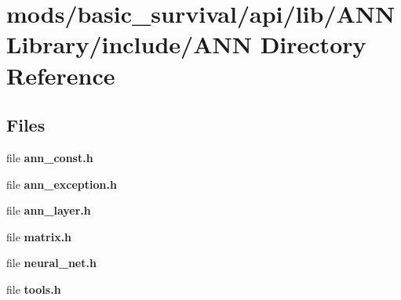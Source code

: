 \section{mods/basic\+\_\+survival/api/lib/\+A\+N\+N\+Library/include/\+A\+N\+N Directory Reference}
\label{dir_24c9e2589b2bb4751b838cdbd42423a3}
\subsection*{Files}
\begin{DoxyCompactItemize}
\item 
file {\bfseries ann\+\_\+const.\+h}
\item 
file {\bfseries ann\+\_\+exception.\+h}
\item 
file {\bfseries ann\+\_\+layer.\+h}
\item 
file {\bfseries matrix.\+h}
\item 
file {\bfseries neural\+\_\+net.\+h}
\item 
file {\bfseries tools.\+h}
\end{DoxyCompactItemize}
